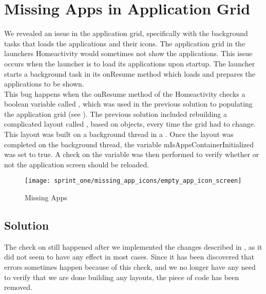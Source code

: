 
\section{Missing Apps in Application Grid}
\label{sec:missing_apps_racecondition}

We revealed an issue in the application grid, specifically with the background tasks that loads the applications and their icons. The application grid in the launchers Homeactivity would sometimes not show the applications. This issue occurs when the launcher is to load its applications upon startup. The launcher starts a background task in its onResume method which loads and prepares the applications to be shown.\\

This bug happens when the onResume method of the Homeactivity checks a boolean variable called , which was used in the previous solution to populating the application grid (see ). The previous solution included rebuilding a complicated layout called , based on  objects, every time the grid had to change. This layout was built on a background thread in a . Once the layout was completed on the background thread, the variable mIsAppsContainerInitialized was set to true. A check on the variable was then performed to verify whether or not the application screen should be reloaded.

\begin{figure}[!htbp]
    \centering
    \texttt{[image: sprint\_one/missing\_app\_icons/empty\_app\_icon\_screen]}
    \caption{Missing Apps}
    \label{fig:missing_apps}
\end{figure}

\subsection{Solution}
\label{sub:missing_apps_racecondition_solution}

The check on  still happened after we implemented the changes described in , as it did not seem to have any effect in most cases. Since it has been discovered that errors sometimes happen because of this check, and we no longer have any need to verify that we are done building any layouts, the piece of code has been removed. 